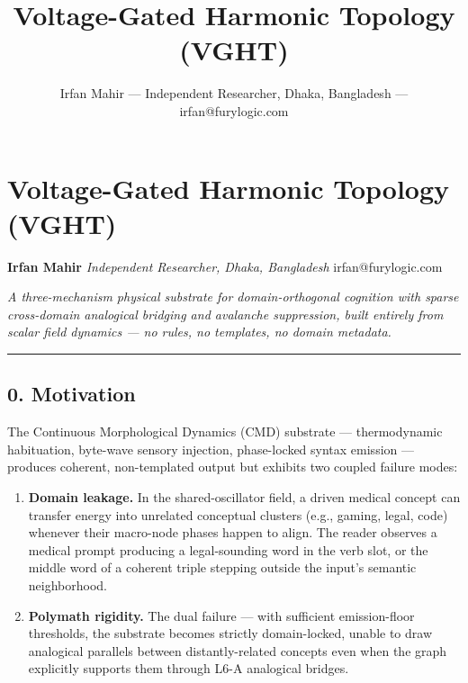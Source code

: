 \documentclass[
  11pt,
  a4paper,
]{article}
\title{Voltage-Gated Harmonic Topology (VGHT)}
\author{Irfan Mahir --- Independent Researcher, Dhaka, Bangladesh ---
irfan@furylogic.com}
\date{}
\providecommand{\tightlist}{%
  \setlength{\itemsep}{0pt}\setlength{\parskip}{0pt}}
\begin{document}
\maketitle

{
\hypersetup{linkcolor=}
\setcounter{tocdepth}{3}
\tableofcontents
}
\section{Voltage-Gated Harmonic Topology
(VGHT)}\label{voltage-gated-harmonic-topology-vght}

\textbf{Irfan Mahir} \emph{Independent Researcher, Dhaka, Bangladesh}
irfan@furylogic.com

\emph{A three-mechanism physical substrate for domain-orthogonal
cognition with sparse cross-domain analogical bridging and avalanche
suppression, built entirely from scalar field dynamics --- no rules, no
templates, no domain metadata.}

\begin{center}\rule{0.5\linewidth}{0.5pt}\end{center}

\subsection{0. Motivation}\label{motivation}

The Continuous Morphological Dynamics (CMD) substrate --- thermodynamic
habituation, byte-wave sensory injection, phase-locked syntax emission
--- produces coherent, non-templated output but exhibits two coupled
failure modes:

\begin{enumerate}
\def\labelenumi{\arabic{enumi}.}
\tightlist
\item
  \textbf{Domain leakage.} In the shared-oscillator field, a driven
  medical concept can transfer energy into unrelated conceptual clusters
  (e.g., gaming, legal, code) whenever their macro-node phases happen to
  align. The reader observes a medical prompt producing a legal-sounding
  word in the verb slot, or the middle word of a coherent triple
  stepping outside the input's semantic neighborhood.
\item
  \textbf{Polymath rigidity.} The dual failure --- with sufficient
  emission-floor thresholds, the substrate becomes strictly
  domain-locked, unable to draw analogical parallels between
  distantly-related concepts even when the graph explicitly supports
  them through L6-A analogical bridges.
\end{enumerate}
\end{document}
